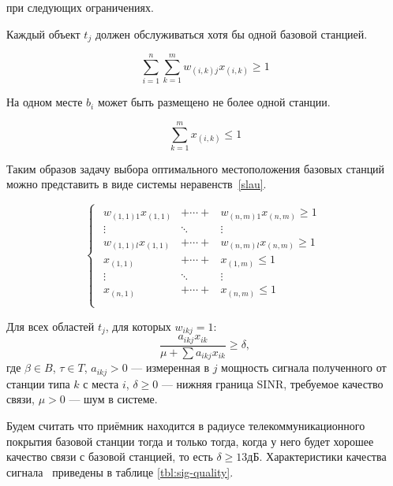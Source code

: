 при следующих ограничениях.

Каждый объект $t_j$ должен обслуживаться хотя бы одной базовой станцией.

\begin{equation}
	\sum_{i=1}^n\sum_{k=1}^m w_{(i,k)j}x_{(i,k)} \ge 1
\end{equation}

На одном месте $b_i$ может быть размещено не более одной станции.

\begin{equation}
 	\sum_{k=1}^{m} x_{(i,k)} \le 1
\end{equation}

Таким образов задачу выбора оптимального местоположения базовых станций можно представить в виде системы неравенств~\ref{slau}.

\begin{equation}
	\label{slau}
	\begin{cases}
		\begin{array}{ccc}
			w_{(1,1)1}x_{(1, 1)} &+  \cdots  +& w_{(n,m)1}x_{(n,m)} \ge 1\\
			\vdots & \ddots & \vdots\\
			w_{(1,1)l}x_{(1, 1)} &+  \cdots  +& w_{(n,m)l}x_{(n,m)} \ge 1\\
			x_{(1,1)}& +  \cdots  + &x_{(1,m)} \le 1\\
			\vdots & \ddots & \vdots\\
			x_{(n,1)} &+  \cdots  + &x_{(n,m)} \le 1\\
		\end{array}
	\end{cases}
\end{equation}

Для всех областей $t_j$, для которых $w_{ikj} = 1$:
\begin{equation}
	\frac{a_{ikj} x_{ik}}{\mu + \sum a_{ikj} x_{ik}} \ge \delta, 
\end{equation}
где $\beta \in B$, $\tau \in T$, $a_{ikj} > 0$ --- измеренная в $j$ мощность сигнала полученного от станции типа $k$ с места $i$, $\delta \ge 0$ --- нижняя граница SINR, требуемое качество связи, $\mu > 0$ --- шум в системе.

Будем считать что приёмник находится в радиусе телекоммуникационного покрытия базовой станции тогда и только тогда, когда у него будет хорошее качество связи с базовой станцией, то 
есть $\delta \ge 13$дБ. Характеристики качества сигнала~\cite{sinr} приведены в таблице \ref{tbl:sig-quality}.

